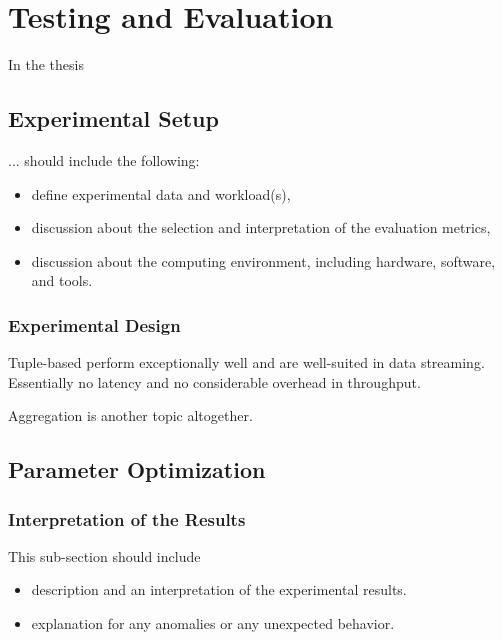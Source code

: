 \chapter{Testing and Evaluation\label{cha:chapter5}}
In the thesis 

\section{Experimental Setup\label{sec:exp}}
... should include the following:
\begin{itemize}

\item define experimental data and workload(s),
\item discussion about the selection and interpretation of the evaluation metrics,
\item discussion about the computing environment, including hardware, software, and tools.
\end{itemize}

\subsection{Experimental Design}

Tuple-based perform exceptionally well and are well-suited in data streaming. Essentially  no latency and no considerable overhead in throughput. 

Aggregation is another topic altogether. 


\section{Parameter Optimization\label{sec:parameterOptimization}}


\subsection{Interpretation of the Results}
This sub-section should include
\begin{itemize}
\item description and an interpretation of the experimental results.
\item explanation for any anomalies or any unexpected behavior.
\end{itemize}

